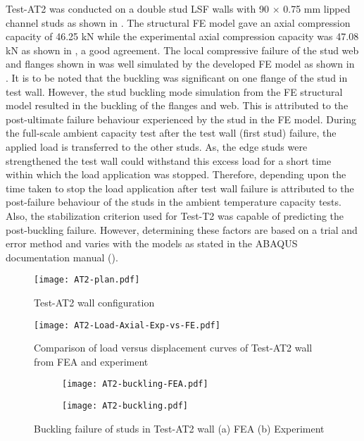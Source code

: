 Test-AT2 was conducted on a double stud LSF walls with 90 $\times$ 0.75 mm lipped channel studs as shown in . The structural FE model gave an axial compression capacity of 46.25 kN while the experimental axial compression capacity was 47.08 kN as shown in , a good agreement. The local compressive failure of the stud web and flanges shown in  was well simulated by the developed FE model as shown in . It is to be noted that the buckling was significant on one flange of the stud in test wall. However, the stud buckling mode simulation from the FE structural model resulted in the buckling of the flanges and web. This is attributed to the post-ultimate failure behaviour experienced by the stud in the FE model. During the full-scale ambient capacity test after the test wall (first stud) failure, the applied load is transferred to the other studs. As, the edge studs were strengthened the test wall could withstand this excess load for a short time within which the load application was stopped. Therefore, depending upon the time taken to stop the load application after test wall failure is attributed to the post-failure behaviour of the studs in the ambient temperature capacity tests. Also, the stabilization criterion used for Test-T2 was capable of predicting the post-buckling failure. However, determining these factors are based on a trial and error method and varies with the models as stated in the ABAQUS documentation manual (\cite{abaqus2017}).   
\begin{figure}[!htbp]
	\centering
			\texttt{[image: AT2-plan.pdf]}\\
		\caption{Test-AT2 wall configuration}
		\label{fig:AT2-plan-fea}
\end{figure}
\begin{figure}[!htbp]
	\centering
			\texttt{[image: AT2-Load-Axial-Exp-vs-FE.pdf]}\\
		\caption{Comparison of load versus displacement curves of Test-AT2 wall from FEA and experiment}
		\label{fig:AT2-fea-results}
\end{figure}
\begin{figure}[!htbp]
	\centering
	\begin{subfigure}[b]{0.4\textwidth}
		\centering
		\texttt{[image: AT2-buckling-FEA.pdf]}
		\caption{}
		\label{subfig:AT2-buckling-FEA}
	\end{subfigure}
	\begin{subfigure}[b]{0.4\textwidth}
		\centering
		\texttt{[image: AT2-buckling.pdf]}
		\caption{}
		\label{subfig:AT2-buckling-experiment}
	\end{subfigure}
	   \caption{Buckling failure of studs in Test-AT2 wall (a) FEA (b) Experiment}
	   \label{fig:AT2-buckling-fea-comparison}
\end{figure} 

